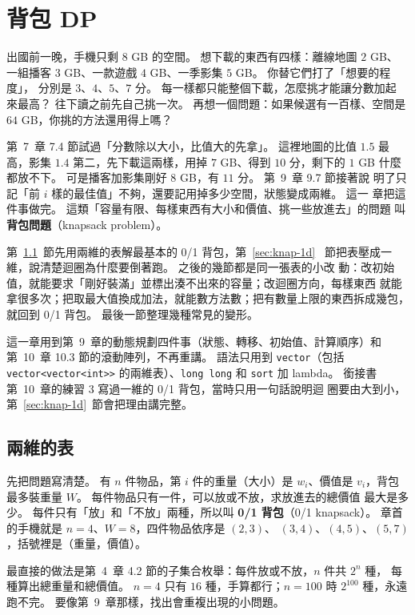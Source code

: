 \chapter{背包 DP}
\label{ch:knapsack}

出國前一晚，手機只剩 $8$ GB 的空間。 想下載的東西有四樣：離線地圖 $2$ GB、
一組播客 $3$ GB、一款遊戲 $4$ GB、一季影集 $5$ GB。 你替它們打了「想要的程度」，
分別是 $3$、$4$、$5$、$7$ 分。 每一樣都只能整個下載，怎麼挑才能讓分數加起
來最高？ 往下讀之前先自己挑一次。 再想一個問題：如果候選有一百樣、空間是
$64$ GB，你挑的方法還用得上嗎？

第~7~章 7.4 節試過「分數除以大小，比值大的先拿」。 這裡地圖的比值 $1.5$ 最
高，影集 $1.4$ 第二，先下載這兩樣，用掉 $7$ GB、得到 $10$ 分，剩下的 $1$ GB
什麼都放不下。 可是播客加影集剛好 $8$ GB，有 $11$ 分。 第~9~章 9.7 節接著說
明了只記「前 $i$ 樣的最佳值」不夠，還要記用掉多少空間，狀態變成兩維。 這一
章把這件事做完。 這類「容量有限、每樣東西有大小和價值、挑一些放進去」的問題
叫\textbf{背包問題}（knapsack problem）。

第~\ref{sec:knap-01}~節先用兩維的表解最基本的 0/1 背包，第~\ref{sec:knap-1d}
~節把表壓成一維，說清楚迴圈為什麼要倒著跑。 之後的幾節都是同一張表的小改
動：改初始值，就能要求「剛好裝滿」並標出湊不出來的容量；改迴圈方向，每樣東西
就能拿很多次；把取最大值換成加法，就能數方法數；把有數量上限的東西拆成幾包，
就回到 0/1 背包。 最後一節整理幾種常見的變形。

這一章用到第~9~章的動態規劃四件事（狀態、轉移、初始值、計算順序）和第~10~章
10.3 節的滾動陣列，不再重講。 語法只用到 \texttt{vector}（包括
\texttt{vector<vector<int>>} 的兩維表）、\texttt{long long} 和 \texttt{sort}
加 lambda。 銜接書第~10~章的練習 3 寫過一維的 0/1 背包，當時只用一句話說明迴
圈要由大到小，第~\ref{sec:knap-1d}~節會把理由講完整。

\section{兩維的表}
\label{sec:knap-01}

先把問題寫清楚。 有 $n$ 件物品，第 $i$ 件的重量（大小）是 $w_i$、價值是
$v_i$，背包最多裝重量 $W$。 每件物品只有一件，可以放或不放，求放進去的總價值
最大是多少。 每件只有「放」和「不放」兩種，所以叫 \textbf{0/1 背包}（0/1
knapsack）。 章首的手機就是 $n = 4$、$W = 8$，四件物品依序是 $(2, 3)$、
$(3, 4)$、$(4, 5)$、$(5, 7)$，括號裡是（重量，價值）。

最直接的做法是第~4~章 4.2 節的子集合枚舉：每件放或不放，$n$ 件共 $2^n$ 種，
每種算出總重量和總價值。 $n = 4$ 只有 $16$ 種，手算都行；$n = 100$ 時
$2^{100}$ 種，永遠跑不完。 要像第~9~章那樣，找出會重複出現的小問題。

